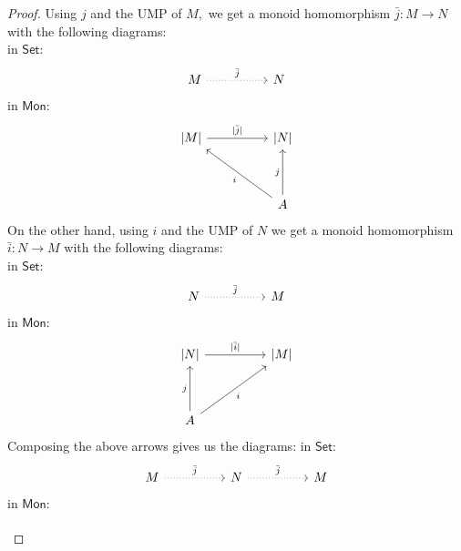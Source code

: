 \begin{proof} 
	Using $j$ and the UMP of $M,$ we get a monoid homomorphism $\bar{j}:M \to N$ with the following diagrams:\\
	in $\mathsf{Set}$:
	\begin{equation*} 
		\begin{tikzcd}
			M \arrow[rr, dotted, "\bar{j}"] && N
		\end{tikzcd}
	\end{equation*}
	in $\mathsf{Mon}$:
	\begin{equation*} 
		\begin{tikzcd}
{\vert}M{\vert} \arrow[rr, "{\vert}\bar{j}{\vert}"] &  & {\vert}N{\vert}                     \\
                                                    &  &                                     \\
                                                    &  & A \arrow[uu, "j"] \arrow[lluu, "i"]
\end{tikzcd}
	\end{equation*}
	On the other hand, using $i$ and the UMP of $N$ we get a monoid homomorphism $\bar{i}:N \to M$ with the following diagrams:\\
	in $\mathsf{Set}$:
	\begin{equation*} 
		\begin{tikzcd}
			N \arrow[rr, dotted, "\bar{j}"] && M
		\end{tikzcd}
	\end{equation*}
	in $\mathsf{Mon}$:
	\begin{equation*} 
		\begin{tikzcd}
{\vert}N{\vert} \arrow[rr, "{\vert}\bar{i}{\vert}"] &  & {\vert}M{\vert} \\
                                                    &  &                 \\
A \arrow[uu, "j"] \arrow[rruu, "i"']                &  &                
		\end{tikzcd}
	\end{equation*}
Composing the above arrows gives us the diagrams:
in $\mathsf{Set}$:
	\begin{equation*} 
		\begin{tikzcd}
			M \arrow[rr, dotted, "\bar{j}"] && N \arrow[rr, dotted, "\bar{j}"] && M
		\end{tikzcd}
	\end{equation*}
	in $\mathsf{Mon}$:
	\begin{equation*} 
		\begin{tikzcd}

\end{tikzcd}
\end{equation*}
\end{proof}
